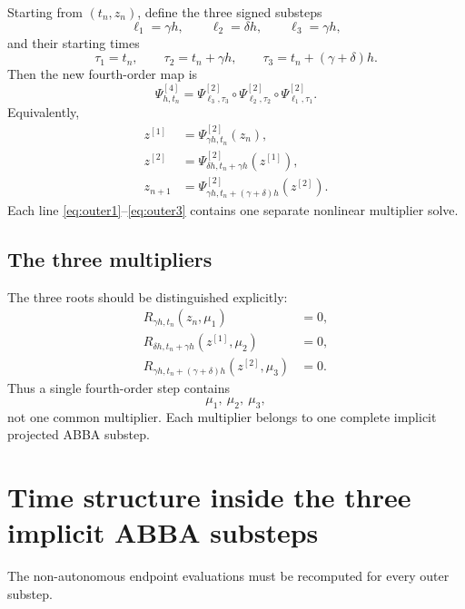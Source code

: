 \documentclass[11pt,a4paper]{article}
\newcommand{\Psitwo}{\Psi^{[2]}}
\newcommand{\Psifour}{\Psi^{[4]}}
\begin{document}
Starting from $(t_n,z_n)$, define the three signed substeps
\begin{equation}
    \ell_1=\gamma h,
    \qquad
    \ell_2=\delta h,
    \qquad
    \ell_3=\gamma h,
\end{equation}
and their starting times
\begin{equation}
    \tau_1=t_n,
    \qquad
    \tau_2=t_n+\gamma h,
    \qquad
    \tau_3=t_n+(\gamma+\delta)h.
\end{equation}
Then the new fourth-order map is
\begin{equation}
    \boxed{
    \Psifour_{h,t_n}
    =\Psitwo_{\ell_3,\tau_3}
     \circ\Psitwo_{\ell_2,\tau_2}
     \circ\Psitwo_{\ell_1,\tau_1}.
    }
    \label{eq:outercomposition}
\end{equation}
Equivalently,
\begin{align}
    z^{[1]}&=\Psitwo_{\gamma h,t_n}(z_n), \label{eq:outer1}\\
    z^{[2]}&=\Psitwo_{\delta h,t_n+\gamma h}(z^{[1]}), \label{eq:outer2}\\
    z_{n+1}&=\Psitwo_{\gamma h,t_n+(\gamma+\delta)h}(z^{[2]}). \label{eq:outer3}
\end{align}
Each line \eqref{eq:outer1}--\eqref{eq:outer3} contains one separate nonlinear multiplier solve.

\subsection*{The three multipliers}
The three roots should be distinguished explicitly:
\begin{align}
R_{\gamma h,t_n}(z_n,\mu_1)&=0,\\
R_{\delta h,t_n+\gamma h}(z^{[1]},\mu_2)&=0,\\
R_{\gamma h,t_n+(\gamma+\delta)h}(z^{[2]},\mu_3)&=0.
\end{align}
Thus a single fourth-order step contains
\begin{equation}
    \boxed{\mu_1,\ \mu_2,\ \mu_3,}
\end{equation}
not one common multiplier. Each multiplier belongs to one complete implicit projected ABBA substep.

\section{Time structure inside the three implicit ABBA substeps}
The non-autonomous endpoint evaluations must be recomputed for every outer substep.
\end{document}
